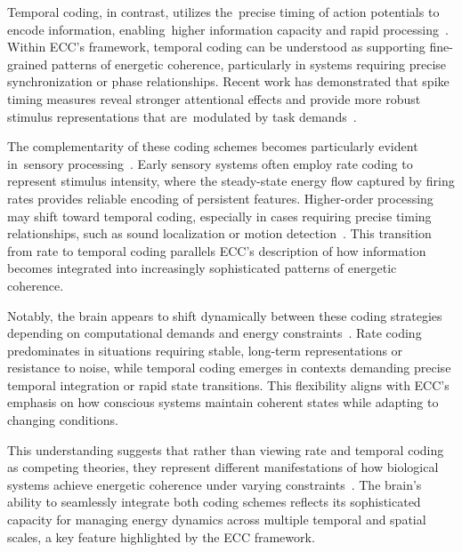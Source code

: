 Temporal coding, in contrast, utilizes the~precise timing of action potentials to encode information, enabling~higher information capacity and rapid processing~\cite{amil2024theta}. Within ECC's framework, temporal coding can be understood as supporting fine-grained patterns of energetic coherence, particularly in systems requiring precise synchronization or phase relationships. Recent work has demonstrated that spike timing measures reveal stronger attentional effects and provide more robust stimulus representations that are~modulated by task demands~\cite{zhang2023adaptive}.

The complementarity of these coding schemes becomes particularly evident in~sensory processing~\cite{pinotsis2023cytoelectric}. Early sensory systems often employ rate coding to represent stimulus intensity, where the steady-state energy flow captured by firing rates provides reliable encoding of persistent features. Higher-order processing may shift toward temporal coding, especially in cases requiring precise timing relationships, such as sound localization or motion detection~\cite{van2025processes}. This transition from rate to temporal coding parallels ECC's description of how information becomes integrated into increasingly sophisticated patterns of energetic coherence.

Notably, the brain appears to shift dynamically between these coding strategies depending on computational demands and energy constraints~\cite{mcdonnell2011}. Rate coding predominates in situations requiring stable, long-term representations or resistance to noise, while temporal coding emerges in contexts demanding precise temporal integration or rapid state transitions. This flexibility aligns with ECC's emphasis on how conscious systems maintain coherent states while adapting to changing conditions.

This understanding suggests that rather than viewing rate and temporal coding as competing theories, they represent different manifestations of how biological systems achieve energetic coherence under varying constraints~\cite{freeman2007}. The brain's ability to seamlessly integrate both coding schemes reflects its sophisticated capacity for managing energy dynamics across multiple temporal and spatial scales, a key feature highlighted by the ECC framework.

